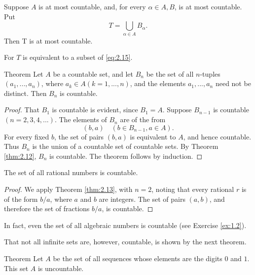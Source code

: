 \begin{myCorollary*}
    Suppose $A$ is at most countable, and, for every $\alpha \in A, B$, is at most countable. Put
    \begin{equation*}
        T = \bigcup_{\alpha\in A} B_\alpha.
    \end{equation*}
    Then T is at most countable.
\end{myCorollary*}

For $T$ is equivalent to a subset of \ref{eq:2.15}.

\begin{thm}
    \label{thm:2.13}
    Theorem Let $A$ be a countable set, and let $B_n$ be the set of all $n$-tuples $(a_1, ...,a_n)$, where $a_k \in  A (k=1,...,n)$, and the elements $a_1, ...,a_n$ need not be distinct. Then $B_n$ is countable.
\end{thm}

\begin{proof}
    That $B_1$ is countable is evident, since $B_1 = A$.
    Suppose $B_{n-1}$ is countable $(n = 2, 3, 4, ... )$.
    The elements of $B_n$ are of the from
    \begin{equation}
        \label{eq:2.18}
        (b,a)
        \quad
        (b \in B_{n-1},a \in A).
    \end{equation}
    For every fixed $b$, the set of pairs $(b, a)$ is equivalent to $A$, and hence countable.
    Thus $B_n$ is the union of a countable set of countable sets.
    By Theorem \ref{thm:2.12}, $B_n$ is countable.
    The theorem follows by induction.
\end{proof}

\begin{myCorollary*}
    The set of all rational numbers is countable.
\end{myCorollary*}

\begin{proof}
    We apply Theorem \ref{thm:2.13},
    with $n = 2$, noting that every rational $r$ is of the form $b / a$,
    where $a$ and $b$ are integers.
    The set of pairs $(a, b)$,
    and therefore the set of fractions $b / a$, is countable.
\end{proof}

In fact, even the set of all algebraic numbers is countable (see Exercise \ref{ex:1.2}).

That not all infinite sets are, however, countable, is shown by the next
theorem.

\begin{thm}
    \label{thm:2.14}
    Theorem Let $A$ be the set of all sequences whose elements are the digits $0$ and $1$.
    This set $A$ is uncountable.
\end{thm}

